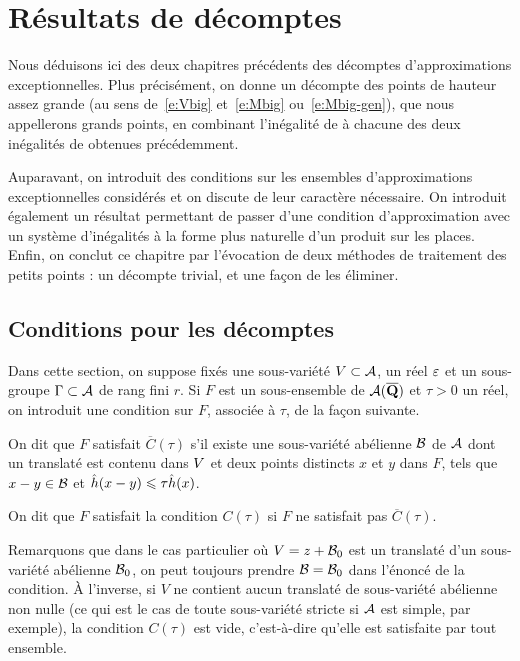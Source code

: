 \chapter{Résultats de décomptes}
\label{chap:union}

Nous déduisons ici des deux chapitres précédents des décomptes
d'approximations exceptionnelles. Plus précisément, on donne un décompte des
points de hauteur assez grande (au sens de~\eqref{e:Vbig} et~\eqref{e:Mbig}
ou~\eqref{e:Mbig-gen}), que nous appellerons grands points, en combinant
l'inégalité de  à chacune des deux inégalités de 
obtenues précédemment.

Auparavant, on introduit des conditions sur les ensembles d'approximations
exceptionnelles considérés et on discute de leur caractère nécessaire. On
introduit également un résultat permettant de passer d'une condition
d'approximation avec un système d'inégalités à la forme plus naturelle d'un
produit sur les places. Enfin, on conclut ce chapitre par l'évocation de deux
méthodes de traitement des petits points : un décompte trivial, et une façon
de les éliminer.


\section{Conditions pour les décomptes}
\label{sec:obstruction}

Dans cette section, on suppose fixés une sous-variété \( V \subset \mathcal A \),
un réel \( \varepsilon \) et un sous-groupe \( \Gamma \subset \mathcal A \) de rang fini \( r
\).  Si \( F \) est un sous-ensemble de \( \mathcal A(\overline{{\mathbf{Q}}}) \) et \( \tau > 0 \) un
réel, on introduit une condition sur \( F \), associée à \( \tau \), de la
façon suivante.

\begin{tdef} \label{d:cond}
  On dit que \( F \) satisfait \( \overline C(\tau) \) s'il existe
  une sous-variété abélienne \( \mathcal B \) de \( \mathcal A \) dont un translaté est
  contenu dans \( V \) et deux points distincts \( x \) et \( y \) dans \(
    F \), tels que \( x - y \in \mathcal B \) et \( \hat h ( x-y ) \leqslant \tau \hat h (x)
  \).

  On dit que \( F \) satisfait la condition \( C(\tau) \) si \( F \) ne
  satisfait pas \( \overline C(\tau) \).
\end{tdef}

Remarquons que dans le cas particulier où \( V = z + \mathcal B_0 \) est un
translaté d'un sous-variété abélienne \( \mathcal B_0 \), on peut toujours prendre
\( \mathcal B = \mathcal B_0 \) dans l'énoncé de la condition. À l'inverse, si \( V \) ne
contient aucun translaté de sous-variété abélienne non nulle (ce qui est le
cas de toute sous-variété stricte si \( \mathcal A \) est simple, par exemple), la
condition \( C(\tau) \) est vide, c'est-à-dire qu'elle est satisfaite par tout
ensemble.

